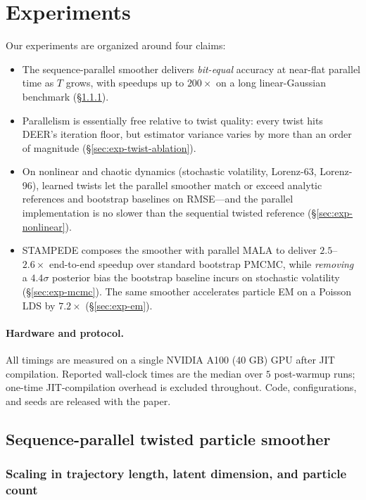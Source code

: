 \documentclass{article}
\begin{document}
\section{Experiments}
\label{sec:experiments}

Our experiments are organized around four claims:
\begin{itemize}
    \setlength{\itemsep}{2pt}
    \item[\textbf{C1}] The sequence-parallel smoother delivers \emph{bit-equal} accuracy at near-flat parallel time as $T$ grows, with speedups up to $200\times$ on a long linear-Gaussian benchmark (\S\ref{sec:exp-T-D-N}).
    \item[\textbf{C2}] Parallelism is essentially free relative to twist quality: every twist hits DEER's iteration floor, but estimator variance varies by more than an order of magnitude (\S\ref{sec:exp-twist-ablation}).
    \item[\textbf{C3}] On nonlinear and chaotic dynamics (stochastic volatility, Lorenz-63, Lorenz-96), learned twists let the parallel smoother match or exceed analytic references and bootstrap baselines on RMSE---and the parallel implementation is no slower than the sequential twisted reference (\S\ref{sec:exp-nonlinear}).
    \item[\textbf{C4}] STAMPEDE composes the smoother with parallel MALA to deliver $2.5$--$2.6\times$ end-to-end speedup over standard bootstrap PMCMC, while \emph{removing} a $4.4\sigma$ posterior bias the bootstrap baseline incurs on stochastic volatility (\S\ref{sec:exp-mcmc}). The same smoother accelerates particle EM on a Poisson LDS by $7.2\times$ (\S\ref{sec:exp-em}).
\end{itemize}

\paragraph{Hardware and protocol.} All timings are measured on a single NVIDIA A100 (40 GB) GPU after JIT compilation. Reported wall-clock times are the median over $5$ post-warmup runs; one-time JIT-compilation overhead is excluded throughout. Code, configurations, and seeds are released with the paper.

\subsection{Sequence-parallel twisted particle smoother}
\label{sec:exp-pf}

\subsubsection{Scaling in trajectory length, latent dimension, and particle count}
\label{sec:exp-T-D-N}
\end{document}
